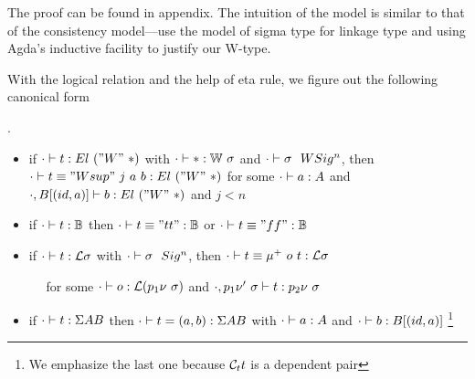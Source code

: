 The proof can be found in appendix. The intuition of the model is similar to that of the consistency model---use the model of sigma type for linkage type and using Agda's inductive facility to justify our W-type. 

With the logical relation and the help of eta rule, we figure out the following canonical form
\begin{theorem}.
  \begin{itemize}
    \item if ${ {\cdot} \vdash {t} : {El~("W"~*)} }$ with ${ {\cdot} \vdash {*} : {{\mathbb{W}}~\sigma} }$ and ${ {\cdot} \vdash {\sigma} \ \ WSig^{n} }$, then ${ {\cdot} \vdash {t \equiv "Wsup"~j~a~b} : {El~("W"~*)} }$ for some ${ {\cdot} \vdash {a} : {A} }$ and ${ {\cdot, B[(id, a)]} \vdash {b} : {El~("W"~*)} }$ and $j < n$
    \item if ${ {\cdot} \vdash {t} : {\mathbb{B}} }$ then ${ {\cdot} \vdash {t \equiv "tt"} : {\mathbb{B}} }$ or ${ {\cdot} \vdash {t \equiv "ff"} : {\mathbb{B}} }$ 
    \item if ${ {\cdot} \vdash {t} : {{\mathcal{L}}\sigma} }$ with ${ {\cdot} \vdash {\sigma} \ \ Sig^{n} }$, then ${ {\cdot} \vdash {t \equiv \mu^+~o~t} : {{\mathcal{L}}\sigma} }$ 
    
      $\quad$ for some ${ {\cdot} \vdash {o} : {{\mathcal{L}}(p_1\nu~\sigma)} }$ and ${ {\cdot, p_1\nu'~\sigma} \vdash {t} : {p_2\nu~\sigma} }$
    \item if ${ {\cdot} \vdash {t} : {\Sigma A B} }$ then ${ {\cdot} \vdash {t = (a, b)} : {\Sigma A B} }$ with ${ {\cdot} \vdash {a} : {A} }$ and ${ {\cdot} \vdash {b} : {B[(id, a)]} }$
    \footnote{We emphasize the last one because ${\mathcal{C}_t} t$ is a dependent pair}
  \end{itemize}
\end{theorem}

